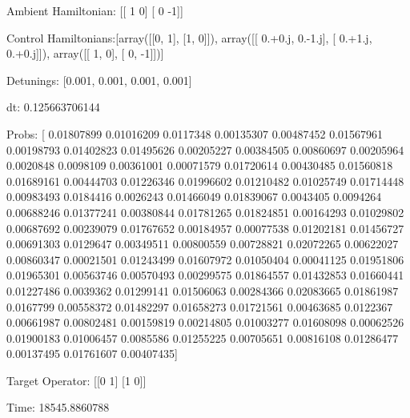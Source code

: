 \documentclass{article}
\begin{document}
    

\newpage

Ambient Hamiltonian: [[ 1  0]
 [ 0 -1]]

Control Hamiltonians:[array([[0, 1],
       [1, 0]]), array([[ 0.+0.j,  0.-1.j],
       [ 0.+1.j,  0.+0.j]]), array([[ 1,  0],
       [ 0, -1]])]

Detunings: [0.001, 0.001, 0.001, 0.001]

 dt: 0.125663706144

Probs: [ 0.01807899  0.01016209  0.0117348   0.00135307  0.00487452  0.01567961
  0.00198793  0.01402823  0.01495626  0.00205227  0.00384505  0.00860697
  0.00205964  0.0020848   0.0098109   0.00361001  0.00071579  0.01720614
  0.00430485  0.01560818  0.01689161  0.00444703  0.01226346  0.01996602
  0.01210482  0.01025749  0.01714448  0.00983493  0.0184416   0.0026243
  0.01466049  0.01839067  0.0043405   0.0094264   0.00688246  0.01377241
  0.00380844  0.01781265  0.01824851  0.00164293  0.01029802  0.00687692
  0.00239079  0.01767652  0.00184957  0.00077538  0.01202181  0.01456727
  0.00691303  0.0129647   0.00349511  0.00800559  0.00728821  0.02072265
  0.00622027  0.00860347  0.00021501  0.01243499  0.01607972  0.01050404
  0.00041125  0.01951806  0.01965301  0.00563746  0.00570493  0.00299575
  0.01864557  0.01432853  0.01660441  0.01227486  0.0039362   0.01299141
  0.01506063  0.00284366  0.02083665  0.01861987  0.0167799   0.00558372
  0.01482297  0.01658273  0.01721561  0.00463685  0.0122367   0.00661987
  0.00802481  0.00159819  0.00214805  0.01003277  0.01608098  0.00062526
  0.01900183  0.01006457  0.0085586   0.01255225  0.00705651  0.00816108
  0.01286477  0.00137495  0.01761607  0.00407435]

Target Operator: [[0 1]
 [1 0]]

Time: 18545.8860788
\end{document}

